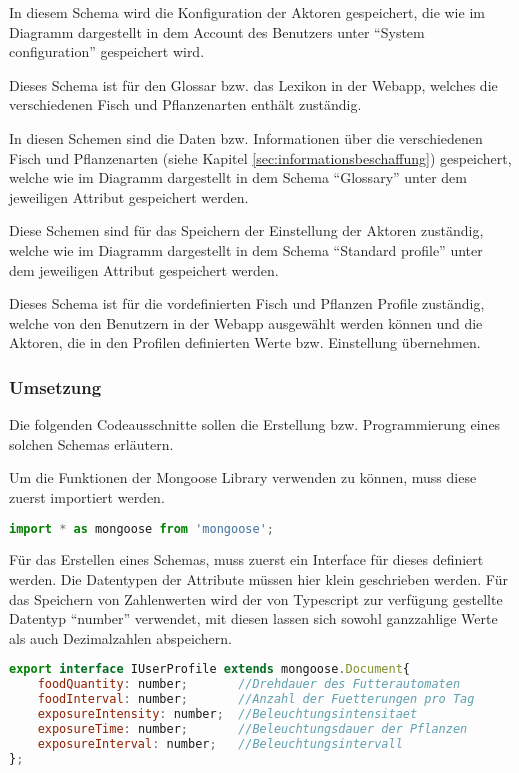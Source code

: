  In diesem Schema wird die Konfiguration der Aktoren gespeichert, die wie im Diagramm dargestellt in dem Account des Benutzers unter "`System configuration"' gespeichert wird.
 
 Dieses Schema ist für den Glossar bzw. das Lexikon in der Webapp, welches die verschiedenen Fisch und Pflanzenarten enthält zuständig.

 In diesen Schemen sind die Daten bzw. Informationen über die verschiedenen Fisch und Pflanzenarten (siehe Kapitel \ref{sec:informationsbeschaffung}) gespeichert, welche wie im Diagramm dargestellt in dem Schema "`Glossary"' unter dem jeweiligen Attribut gespeichert werden.
 
 Diese Schemen sind für das Speichern der Einstellung der Aktoren zuständig, welche wie im Diagramm dargestellt in dem Schema "`Standard profile"' unter dem jeweiligen Attribut gespeichert werden.

 Dieses Schema ist für die vordefinierten Fisch und Pflanzen Profile zuständig, welche von den Benutzern in der Webapp ausgewählt werden können und die Aktoren, die in den Profilen definierten Werte bzw. Einstellung übernehmen.
 
 \newpage
 
 \subsubsection{Umsetzung}
 
Die folgenden Codeausschnitte sollen die Erstellung bzw. Programmierung eines solchen Schemas erläutern.
 
Um die Funktionen der Mongoose Library verwenden zu können, muss diese zuerst importiert werden.

\begin{lstlisting}[language=Javascript, caption=Importieren von Mongoose]
import * as mongoose from 'mongoose';
\end{lstlisting}

Für das Erstellen eines Schemas, muss zuerst ein Interface für dieses definiert werden. Die Datentypen der Attribute müssen hier klein geschrieben werden. Für das Speichern von Zahlenwerten wird der von Typescript zur verfügung gestellte Datentyp "`number"' verwendet, mit diesen lassen sich sowohl ganzzahlige Werte als auch Dezimalzahlen abspeichern.

\begin{lstlisting}[language=Javascript, caption=Erstellen des Interfaces für das Schema User profile]
export interface IUserProfile extends mongoose.Document{
	foodQuantity: number;       //Drehdauer des Futterautomaten
	foodInterval: number;       //Anzahl der Fuetterungen pro Tag
	exposureIntensity: number;  //Beleuchtungsintensitaet
	exposureTime: number;       //Beleuchtungsdauer der Pflanzen
	exposureInterval: number;   //Beleuchtungsintervall
};
\end{lstlisting}

